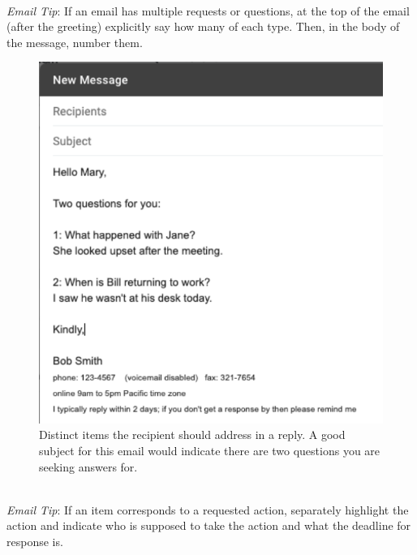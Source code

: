 \ \\
\textit{Email Tip}: If an email has multiple requests or questions, at the top of the email (after the greeting) explicitly say how many of each type. Then, in the body of the message, number them.

\begin{figure}
\includegraphics[width=1\textwidth]{images/email_two_questions.pdf}
\caption{Distinct items the recipient should address in a reply. A good subject for this email would indicate there are two questions you are seeking answers for.}
\label{fig:email_two_questions}
\end{figure}

\ \\
\textit{Email Tip}: If an item corresponds to a requested action, separately highlight the action and indicate who is supposed to take the action and what the deadline for response is.

